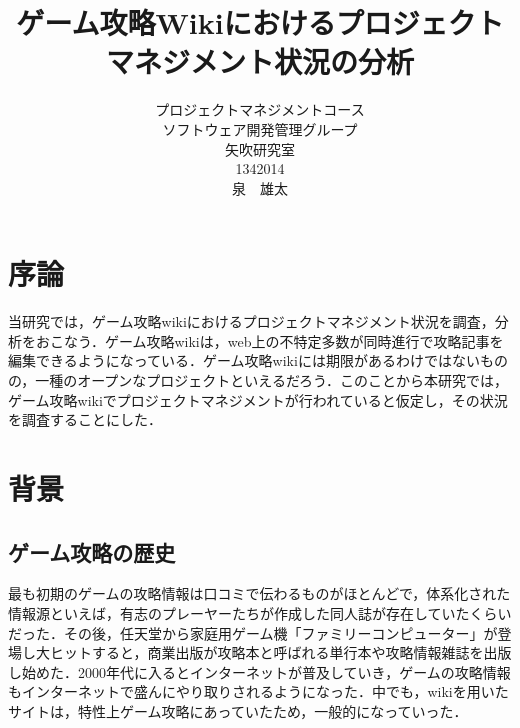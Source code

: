 \title{ゲーム攻略Wikiにおけるプロジェクトマネジメント状況の分析}
\author{プロジェクトマネジメントコース\\
ソフトウェア開発管理グループ\\
矢吹研究室\\
1342014\\
泉　雄太}
\date{}

\maketitle



\tableofcontents%

\chapter{序論}

当研究では，ゲーム攻略wikiにおけるプロジェクトマネジメント状況を調査，分析をおこなう．ゲーム攻略wikiは，web上の不特定多数が同時進行で攻略記事を編集できるようになっている．ゲーム攻略wikiには期限があるわけではないものの，一種のオープンなプロジェクトといえるだろう．このことから本研究では，ゲーム攻略wikiでプロジェクトマネジメントが行われていると仮定し，その状況を調査することにした．

\chapter{背景}

\section{ゲーム攻略の歴史}


最も初期のゲームの攻略情報は口コミで伝わるものがほとんどで，体系化された情報源といえば，有志のプレーヤーたちが作成した同人誌が存在していたくらいだった．その後，任天堂から家庭用ゲーム機「ファミリーコンピューター」が登場し大ヒットすると，商業出版が攻略本と呼ばれる単行本や攻略情報雑誌を出版し始めた．2000年代に入るとインターネットが普及していき，ゲームの攻略情報もインターネットで盛んにやり取りされるようになった．中でも，wikiを用いたサイトは，特性上ゲーム攻略にあっていたため，一般的になっていった．


